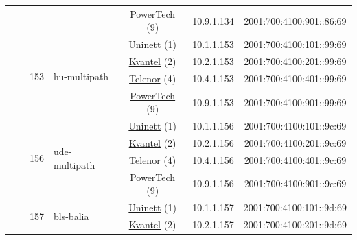 \begin{small}
\begin{center}
\begin{longtable}{|c|c|c|c|c|c|c|c|}
  &  &  &  & \multicolumn{2}{|c|}{\tiny{\href{http://www.powertech.no}{PowerTech} (9)}} & \tiny{10.9.1.134} & \tiny{2001:700:4100:901::86:69} \\* \cline{3-3}\cline{4-4}\cline{5-5}\cline{6-6}\cline{7-7}\cline{8-8}
  &  & \multirow{4}{*}{\tiny{153}} & \multicolumn{1}{|l|}{\multirow{4}{*}{\tiny{hu-multipath}}} & \multicolumn{2}{|c|}{\tiny{\href{https://www.uninett.no}{Uninett} (1)}} & \tiny{10.1.1.153} & \tiny{2001:700:4100:101::99:69} \\* \cline{5-5}\cline{6-6}\cline{7-7}\cline{8-8}
  &  &  &  & \multicolumn{2}{|c|}{\tiny{\href{http://kvantel.no}{Kvantel} (2)}} & \tiny{10.2.1.153} & \tiny{2001:700:4100:201::99:69} \\* \cline{5-5}\cline{6-6}\cline{7-7}\cline{8-8}
  &  &  &  & \multicolumn{2}{|c|}{\tiny{\href{https://www.telenor.no}{Telenor} (4)}} & \tiny{10.4.1.153} & \tiny{2001:700:4100:401::99:69} \\* \cline{5-5}\cline{6-6}\cline{7-7}\cline{8-8}
  &  &  &  & \multicolumn{2}{|c|}{\tiny{\href{http://www.powertech.no}{PowerTech} (9)}} & \tiny{10.9.1.153} & \tiny{2001:700:4100:901::99:69} \\* \cline{3-3}\cline{4-4}\cline{5-5}\cline{6-6}\cline{7-7}\cline{8-8}
  &  & \multirow{4}{*}{\tiny{156}} & \multicolumn{1}{|l|}{\multirow{4}{*}{\tiny{ude-multipath}}} & \multicolumn{2}{|c|}{\tiny{\href{https://www.uninett.no}{Uninett} (1)}} & \tiny{10.1.1.156} & \tiny{2001:700:4100:101::9c:69} \\* \cline{5-5}\cline{6-6}\cline{7-7}\cline{8-8}
  &  &  &  & \multicolumn{2}{|c|}{\tiny{\href{http://kvantel.no}{Kvantel} (2)}} & \tiny{10.2.1.156} & \tiny{2001:700:4100:201::9c:69} \\* \cline{5-5}\cline{6-6}\cline{7-7}\cline{8-8}
  &  &  &  & \multicolumn{2}{|c|}{\tiny{\href{https://www.telenor.no}{Telenor} (4)}} & \tiny{10.4.1.156} & \tiny{2001:700:4100:401::9c:69} \\* \cline{5-5}\cline{6-6}\cline{7-7}\cline{8-8}
  &  &  &  & \multicolumn{2}{|c|}{\tiny{\href{http://www.powertech.no}{PowerTech} (9)}} & \tiny{10.9.1.156} & \tiny{2001:700:4100:901::9c:69} \\* \cline{3-3}\cline{4-4}\cline{5-5}\cline{6-6}\cline{7-7}\cline{8-8}
  &  & \multirow{4}{*}{\tiny{157}} & \multicolumn{1}{|l|}{\multirow{4}{*}{\tiny{bls-balia}}} & \multicolumn{2}{|c|}{\tiny{\href{https://www.uninett.no}{Uninett} (1)}} & \tiny{10.1.1.157} & \tiny{2001:700:4100:101::9d:69} \\* \cline{5-5}\cline{6-6}\cline{7-7}\cline{8-8}
  &  &  &  & \multicolumn{2}{|c|}{\tiny{\href{http://kvantel.no}{Kvantel} (2)}} & \tiny{10.2.1.157} & \tiny{2001:700:4100:201::9d:69} \\* \cline{5-5}\cline{6-6}\cline{7-7}\cline{8-8}

\end{longtable}
\end{center}
\end{small}
